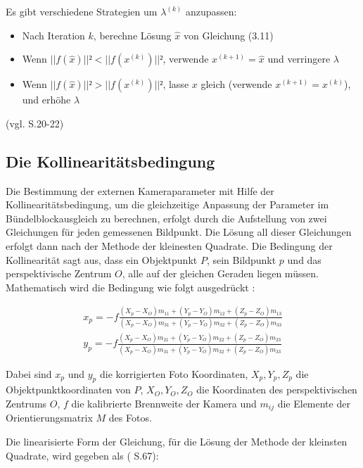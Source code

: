 Es gibt verschiedene Strategien um $\lambda^{(k)}$ anzupassen:

\begin{itemize}
\item Nach Iteration $k$, berechne Lösung $\hat{x}$ von Gleichung (3.11)
\item Wenn $||f(\hat{x})||²<||f(x^{(k)})||²$, verwende $x^{(k+1)} = \hat{x}$ und verringere $\lambda$
\item Wenn $||f(\hat{x})||²>||f(x^{(k)})||²$, lasse $x$ gleich (verwende $x^{(k+1)} = x^{(k)}$), und erhöhe $\lambda$
\end{itemize}
(vgl. \cite{nonlinear_1} S.20-22)


\subsection{Die Kollinearitätsbedingung}

Die Bestimmung der externen Kameraparameter mit Hilfe der Kollinearitätsbedingung, um die gleichzeitige Anpassung der Parameter im Bündelblockausgleich zu berechnen, erfolgt durch die Aufstellung von zwei Gleichungen für jeden gemessenen Bildpunkt. Die Lösung all dieser Gleichungen erfolgt dann nach der Methode der kleinesten Quadrate. Die Bedingung der Kollinearität sagt aus, dass ein Objektpunkt $P$, sein Bildpunkt $p$ und das perspektivische Zentrum $O$, alle auf der gleichen Geraden liegen müssen. Mathematisch wird die Bedingung wie folgt ausgedrückt  \cite{coll_exterior}:

\begin{equation}
\begin{aligned}
  x_p = -f \frac{(X_p-X_O)m_{11}+(Y_p-Y_O)m_{12}+(Z_p-Z_O)m_{13}}{(X_p-X_O)m_{31}+(Y_p-Y_O)m_{32}+(Z_p-Z_O)m_{33}} \\
    y_p = -f \frac{(X_p-X_O)m_{21}+(Y_p-Y_O)m_{22}+(Z_p-Z_O)m_{23}}{(X_p-X_O)m_{31}+(Y_p-Y_O)m_{32}+(Z_p-Z_O)m_{33}}
\end{aligned}
\end{equation}

Dabei sind $x_p$ und $y_p$ die korrigierten Foto Koordinaten, $X_p,Y_p,Z_p$ die Objektpunktkoordinaten von $P$, $X_O,Y_O,Z_O$ die Koordinaten des perspektivischen Zentrums $O$, $f$ die kalibrierte Brennweite der Kamera und $m_{ij}$ die Elemente der Orientierungsmatrix $M$ des Fotos.

Die linearisierte Form der Gleichung, für die Lösung der Methode der kleinsten Quadrate, wird gegeben als (\cite{comparative_conditions_study} S.67):

